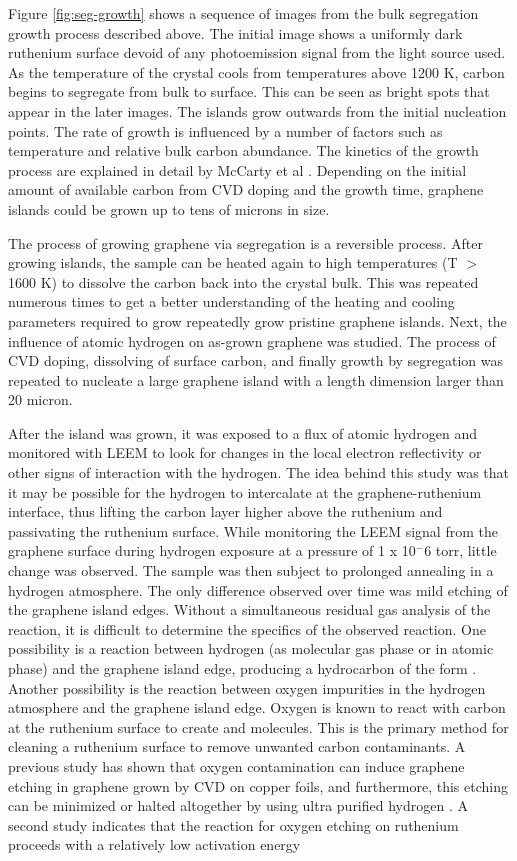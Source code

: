 Figure \ref{fig:seg-growth} shows a sequence of images from the bulk segregation growth process described above. The initial image shows a uniformly dark ruthenium surface devoid of any photoemission signal from the light source used. As the temperature of the crystal cools from temperatures above 1200 K, carbon begins to segregate from bulk to surface. This can be seen as bright spots that appear in the later images. The islands grow outwards from the initial nucleation points. The rate of growth is influenced by a number of factors such as temperature and relative bulk carbon abundance. The kinetics of the growth process are explained in detail by McCarty et al \cite{mccarty-carbon}. Depending on the initial amount of available carbon from CVD doping and the growth time, graphene islands could be grown up to tens of microns in size.

The process of growing graphene via segregation is a reversible process. After growing islands, the sample can be heated again to high temperatures (T $>$ 1600 K) to dissolve the carbon back into the crystal bulk. This was repeated numerous times to get a better understanding of the heating and cooling parameters required to grow repeatedly grow pristine graphene islands. Next, the influence of atomic hydrogen on as-grown graphene was studied. The process of CVD doping, dissolving of surface carbon, and finally growth by segregation was repeated to nucleate a large graphene island with a length dimension larger than 20 micron.

After the island was grown, it was exposed to a flux of atomic hydrogen and monitored with LEEM to look for changes in the local electron reflectivity or other signs of interaction with the hydrogen. The idea behind this study was that it may be possible for the hydrogen to intercalate at the graphene-ruthenium interface, thus lifting the carbon layer higher above the ruthenium and passivating the ruthenium surface. While monitoring the LEEM signal from the graphene surface during hydrogen exposure at a pressure of 1 x 10$^-6$ torr, little change was observed. The sample was then subject to prolonged annealing in a hydrogen atmosphere. The only difference observed over time was mild etching of the graphene island edges. Without a simultaneous residual gas analysis of the reaction, it is difficult to determine the specifics of the observed reaction. One possibility is a reaction between hydrogen (as molecular gas phase or in atomic phase) and the graphene island edge, producing a hydrocarbon of the form . Another possibility is the reaction between oxygen impurities in the hydrogen atmosphere and the graphene island edge. Oxygen is known to react with carbon at the ruthenium surface to create  and  molecules. This is the primary method for cleaning a ruthenium surface to remove unwanted carbon contaminants. A previous study has shown that oxygen contamination can induce graphene etching in graphene grown by CVD on copper foils, and furthermore, this etching can be minimized or halted altogether by using ultra purified hydrogen \cite{graphene-etching}. A second study indicates that the reaction for oxygen etching on ruthenium proceeds with a relatively low activation energy \cite{graphene-etching-ru-O2}

